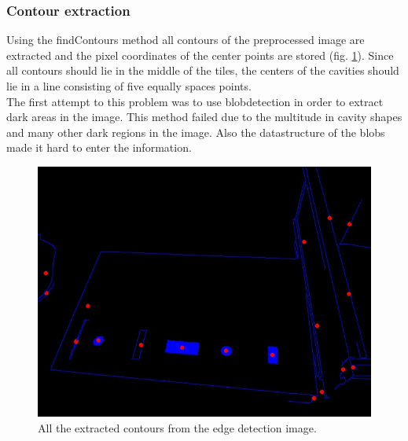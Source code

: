 \documentclass{article}
\begin{document}
\subsubsection*{Contour extraction}
Using the findContours method all contours of the preprocessed image are extracted and the pixel coordinates of the center points are stored (fig. \ref{fig:cavities}). Since all contours should lie in the middle of the tiles, the centers of the cavities should lie in a line consisting of five equally spaces points. \\
The first attempt to this problem was to use blobdetection in order to extract dark areas in the image. This method failed due to the multitude in cavity shapes and many other dark regions in the image. Also the datastructure of the blobs made it hard to enter the information. 
\begin{figure}[h!]
\centering
\includegraphics[scale=0.3]{images/cavitycontours.jpg}
\caption{All the extracted contours from the edge detection image.}
\label{fig:cavities}
\end{figure}
\end{document}

